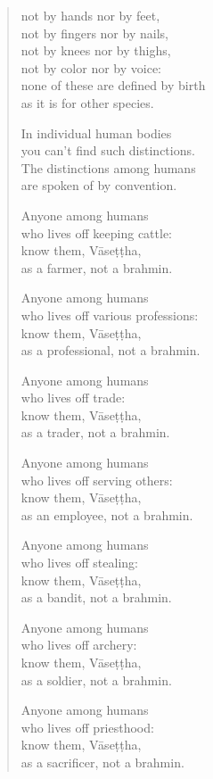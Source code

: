 \documentclass[12pt,openany]{book}%
\begin{document}
\begin{verse}
not by hands nor by feet, \\
not by fingers nor by nails, \\
not by knees nor by thighs, \\
not by color nor by voice: \\
none of these are defined by birth \\
as it is for other species. 

In individual human bodies \\
you can’t find such distinctions. \\
The distinctions among humans \\
are spoken of by convention. 

Anyone among humans \\
who lives off keeping cattle: \\
know them, \textsanskrit{Vāseṭṭha}, \\
as a farmer, not a brahmin. 

Anyone among humans \\
who lives off various professions: \\
know them, \textsanskrit{Vāseṭṭha}, \\
as a professional, not a brahmin. 

Anyone among humans \\
who lives off trade: \\
know them, \textsanskrit{Vāseṭṭha}, \\
as a trader, not a brahmin. 

Anyone among humans \\
who lives off serving others: \\
know them, \textsanskrit{Vāseṭṭha}, \\
as an employee, not a brahmin. 

Anyone among humans \\
who lives off stealing: \\
know them, \textsanskrit{Vāseṭṭha}, \\
as a bandit, not a brahmin. 

Anyone among humans \\
who lives off archery: \\
know them, \textsanskrit{Vāseṭṭha}, \\
as a soldier, not a brahmin. 

Anyone among humans \\
who lives off priesthood: \\
know them, \textsanskrit{Vāseṭṭha}, \\
as a sacrificer, not a brahmin. 


\end{verse}
\end{document}
